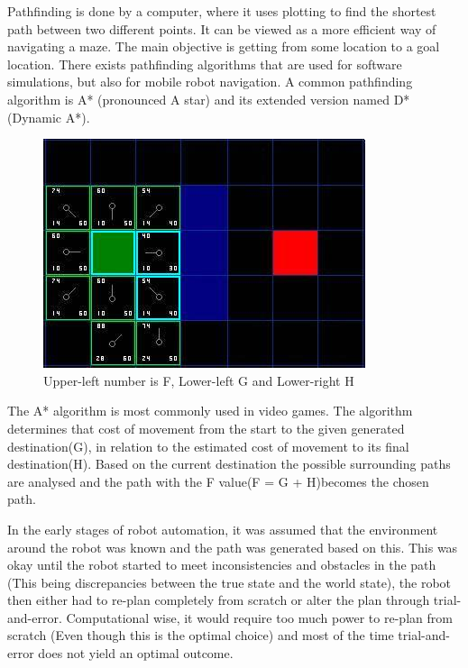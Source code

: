 Pathfinding is done by a computer, where it uses plotting to find the shortest path between two different points. It can be viewed as a more efficient way of navigating a maze. The main objective is getting from some location to a goal location.
There exists pathfinding algorithms that are used for software simulations, but also for mobile robot navigation. A common pathfinding algorithm is A* (pronounced A star) and its extended version named D* (Dynamic A*).

\begin{figure}[H]
\centering
\includegraphics[width=.7\linewidth]{images/aStar2.jpg}
\caption{Upper-left number is F, Lower-left G and Lower-right H}
\label{fig:sub2}
\end{figure}

The A* algorithm is most commonly used in video games. The algorithm determines that cost of movement from the start to the given generated destination(G), in relation to the estimated cost of movement to its final destination(H). Based on the current destination the possible surrounding paths are analysed and the path with the F value(F = G + H)becomes the chosen path.\cite{astar}

In the early stages of robot automation, it was assumed that the environment around the robot was known and the path was generated based on this. This was okay until the robot started to meet inconsistencies and obstacles in the path (This being discrepancies between the true state and the world state), the robot then either had to re-plan completely from scratch or alter the plan through trial-and-error. Computational wise, it would require too much power to re-plan from scratch (Even though this is the optimal choice) and most of the time trial-and-error does not yield an optimal outcome.


